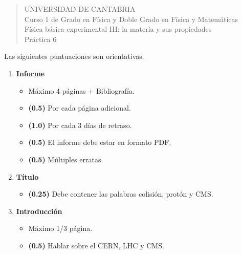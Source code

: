 \documentclass[11pt]{articulo}
\begin{document}
\begin{verse}
{\Large UNIVERSIDAD DE CANTABRIA}\\ 
\vspace*{0.5cm}
{\normalsize \rm Curso 1 de Grado en F\'isica y Doble Grado en F\'isica y Matem\'aticas}\\
{\normalsize \rm F\'isica b\'asica experimental III: la materia y sus propiedades}\\ 
{\normalsize \rm Pr\'actica 6}\\
\end{verse} 

\vspace*{0.25cm}

Las siguientes puntuaciones son orientativas.

\begin{enumerate}

\item {\bf Informe}

\begin{itemize}

\item M\'aximo 4 p\'aginas + Bibliograf\'ia.

\item {\bf (0.5)} Por cada p\'agina adicional.

\item {\bf (1.0)} Por cada 3 d\'ias de retraso.

\item {\bf (0.5)} El informe debe estar en formato PDF.

\item {\bf (0.5)} M\'ultiples erratas.

\end{itemize}

\item {\bf T\'itulo}

\begin{itemize}

\item {\bf (0.25)} Debe contener las palabras colisi\'on, prot\'on y CMS.

\end{itemize}

\item {\bf Introducci\'on}

\begin{itemize}

\item M\'aximo 1/3 p\'agina.

\item {\bf (0.5)} Hablar sobre el CERN, LHC y CMS.


\end{itemize}
\end{enumerate}
\end{document}

